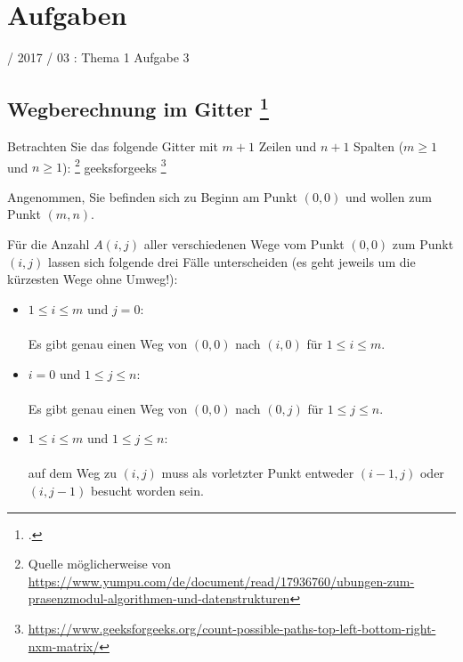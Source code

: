 \documentclass{lehramt-informatik-haupt}
\begin{document}
\chapter{Aufgaben}

%

 / 2017 / 03 : Thema 1 Aufgabe 3

%

\section{Wegberechnung im Gitter
\footcite[Seite 1, Aufgabe 2: Dynamische Programmierung]{aud:ab:3}}

Betrachten Sie das folgende Gitter mit $m + 1$ Zeilen und $n + 1$
Spalten ($m \geq 1$ und $n \geq 1$):
\footnote{Quelle möglicherweise von \url{https://www.yumpu.com/de/document/read/17936760/ubungen-zum-prasenzmodul-algorithmen-und-datenstrukturen}}
geeksforgeeks
\footnote{\url{https://www.geeksforgeeks.org/count-possible-paths-top-left-bottom-right-nxm-matrix/}}

Angenommen, Sie befinden sich zu Beginn am Punkt $(0, 0)$ und wollen zum
Punkt $(m, n)$.

Für die Anzahl $A(i, j)$ aller verschiedenen Wege vom Punkt $(0, 0)$ zum
Punkt $(i, j)$ lassen sich folgende drei Fälle unterscheiden (es geht
jeweils um die kürzesten Wege
ohne Umweg!):

\begin{itemize}
\item $1 \leq i \leq m$ und $j = 0$:\\\\
Es gibt genau einen Weg von $(0, 0)$ nach $(i, 0)$ für
$1 \leq i \leq m$.

\item $i = 0$ und $1 \leq j \leq n$:\\\\
Es gibt genau einen Weg von $(0, 0)$ nach $(0, j)$ für
$1 \leq j \leq n$.

\item $1 \leq i \leq m$ und $1 \leq j \leq n$:\\\\
auf dem Weg zu $(i, j)$
muss als vorletzter Punkt entweder $(i-1, j)$ oder $(i, j-1)$ besucht
worden sein.
\end{itemize}
\end{document}
